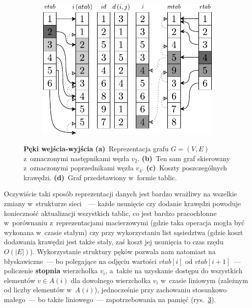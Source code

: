 \begin{figure}[!htbp]
\begin{subfigure}[b]{0.136\textwidth}
		\caption{}
		\label{fig:forwardReverseStarRepresentation:c}
	\end{subfigure}
	\hfill
	\begin{subfigure}[b]{0.50\textwidth}
		\includegraphics[width=\textwidth]{Chapter_I/FORWARD-REVERSE-STAR-Example/d.pdf}
		\caption{}
		\label{fig:forwardReverseStarRepresentation:d}
	\end{subfigure}
	\hfill\null
	\caption{
		\textbf{Pęki wejścia-wyjścia}
		\textbf{(a)}~Reprezentacja grafu $G = \left( V, E \right)$ z~oznaczonymi następnikami węzła $v_{2}$.
		\textbf{(b)}~Ten sam graf skierowany z~oznaczonymi poprzednikami węzła $v_{4}$.
		\textbf{(c)}~Koszty poszczególnych krawędzi.
		\textbf{(d)}~Graf przedstawiony w~formie tablic.
	}
	\label{fig:forwardReverseStarRepresentation}
\end{figure}

Oczywiście taki sposób reprezentacji danych jest bardzo wrażliwy na wszelkie zmiany w~strukturze sieci~\cite{eCOMPASS_TR_005}~--- każde usunięcie czy dodanie krawędzi powoduje konieczność aktualizacji wszystkich tablic, co jest bardzo pracochłonne w~porównaniu z~reprezentacjami macierzowymi (gdzie taka operacja mogła być wykonana w~czasie stałym) czy przy wykorzystaniu list sąsiedztwa (gdzie koszt dodawania krawędzi jest także stały, zaś koszt jej usunięcia to czas rzędu $O \left( \left| E \right| \right)$).
Wykorzystanie struktury pęków pozwala nam natomiast na błyskawiczne~--- bo polegające na odjęciu wartości $vtab \left[ i \right]$ od $vtab \left[ i+1 \right]$~--- policzenie \textbf{stopnia} wierzchołka $v_{i}$, a~także na uzyskanie dostępu do wszystkich elementów $v \in A \left( i \right)$ dla dowolnego wierzchołka $v_{i}$ w~czasie liniowym (zależnym od liczby elementów w~$A \left( i \right) $), jednocześnie przy zachowaniu stosunkowo małego~--- bo także liniowego~--- zapotrzebowania na pamięć (rys.~\ref{fig:forwardReverseStarRepresentation}).



